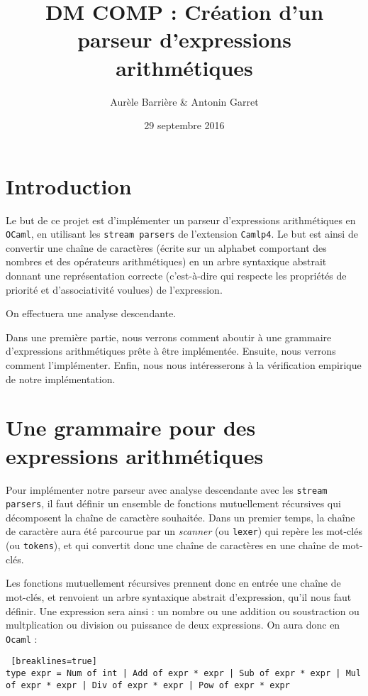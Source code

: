 \documentclass[11pt]{article}
\title{DM COMP : Création d'un parseur d'expressions arithmétiques}
\author{Aurèle Barrière \& Antonin Garret}
\date{29 septembre 2016}
\begin{document}
\maketitle

\section{Introduction}
Le but de ce projet est d'implémenter un parseur d'expressions arithmétiques en \texttt{OCaml}, en utilisant les \texttt{stream parsers} de l'extension \texttt{Camlp4}. Le but est ainsi de convertir une chaîne de caractères (écrite sur un alphabet comportant des nombres et des opérateurs arithmétiques) en un arbre syntaxique abstrait donnant une représentation correcte (c'est-à-dire qui respecte les propriétés de priorité et d'associativité voulues) de l'expression.

On effectuera une analyse descendante.


Dans une première partie, nous verrons comment aboutir à une grammaire d'expressions arithmétiques prête à être implémentée. Ensuite, nous verrons comment l'implémenter. Enfin, nous nous intéresserons à la vérification empirique de notre implémentation.

\section{Une grammaire pour des expressions arithmétiques}

Pour implémenter notre parseur avec analyse descendante avec les \texttt{stream parsers}, il faut définir un ensemble de fonctions mutuellement récursives qui décomposent la chaîne de caractère souhaitée. Dans un premier temps, la chaîne de caractère aura été parcourue par un \textit{scanner} (ou \texttt{lexer}) qui repère les mot-clés (ou \texttt{tokens}), et qui convertit donc une chaîne de caractères en une chaîne de mot-clés.

Les fonctions mutuellement récursives prennent donc en entrée une chaîne de mot-clés, et renvoient un arbre syntaxique abstrait d'expression, qu'il nous faut définir. Une expression sera ainsi : un nombre ou une addition ou soustraction ou multplication ou division ou puissance de deux expressions. On aura donc en \texttt{Ocaml} : 
\begin{lstlisting} [breaklines=true]
type expr = Num of int | Add of expr * expr | Sub of expr * expr | Mul of expr * expr | Div of expr * expr | Pow of expr * expr 
\end{lstlisting}
\end{document}

